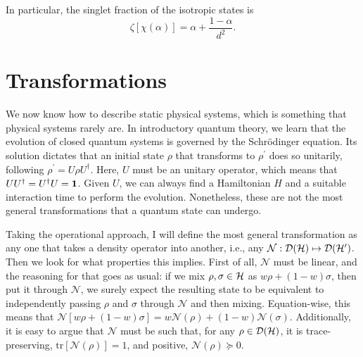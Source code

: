 		In particular, the singlet fraction of the isotropic states is
		\begin{equation}
			\zeta\left[ \chi(\alpha) \right] = \alpha + \frac{1 - \alpha}{d^2} .
			\label{eq:singlet-fraction-isotropic-states}
		\end{equation}


	\section{Transformations}
	\label{sec:transformations}

		We now know how to describe static physical systems, which is something that physical systems rarely are. In introductory quantum theory, we learn that the evolution of closed quantum systems is governed by the Schrödinger equation. Its solution dictates that an initial state $\rho$ that transforms to $\rho^\prime$ does so unitarily, following $\rho^\prime = U \rho U^\dagger$. Here, $U$ must be an unitary operator, which means that $UU^\dagger = U^\dagger U = \mathbf{1}$. Given $U$, we can always find a Hamiltonian $H$ and a suitable interaction time to perform the evolution. Nonetheless, these are not the most general transformations that a quantum state can undergo.
		
		Taking the operational approach, I will define the most general transformation as any one that takes a density operator into another, i.e., any $\mathcal{N} : \mathcal{D}(\mathcal{H}) \mapsto \mathcal{D}(\mathcal{H}^\prime)$. Then we look for what properties this implies. First of all, $\mathcal{N}$ must be linear, and the reasoning for that goes as usual: if we mix $\rho, \sigma \in \mathcal{H}$ as $w \rho + (1-w) \sigma$, then put it through $\mathcal{N}$, we surely expect the resulting state to be equivalent to independently passing $\rho$ and $\sigma$ through $\mathcal{N}$ and then mixing. Equation-wise, this means that $\mathcal{N} \left[ w \rho + (1-w) \sigma \right] = w \mathcal{N}(\rho) + (1-w) \mathcal{N}(\sigma)$. Additionally, it is easy to argue that $\mathcal{N}$ must be such that, for any $\rho \in \mathcal{D}(\mathcal{H})$, it is trace-preserving, $\text{tr}\left[ \mathcal{N}(\rho) \right] = 1$, and positive, $\mathcal{N}(\rho) \succeq 0$.
		
